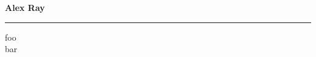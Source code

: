 \documentclass[10pt,letterpaper,notitlepage,onecolumn,oneside]{article}
\begin{document}
{\centering
{\large \bf Alex Ray}
\hrule
foo \\
bar \\
}





 
% 
%
% 
% 
% 
\end{document}
